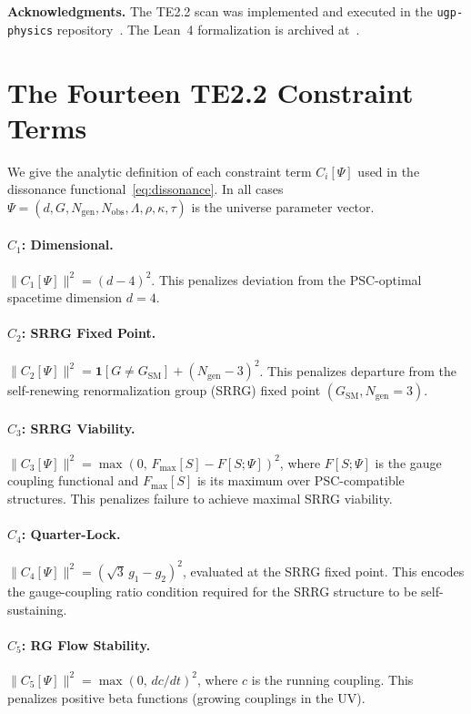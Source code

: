 \documentclass[11pt,twocolumn]{article}
\theoremstyle{remark}
\begin{document}
\bigskip
\noindent\textbf{Acknowledgments.}
The TE2.2 scan was implemented and executed in the
\texttt{ugp-physics} repository~\cite{ugp-physics-repo}.
The Lean~4 formalization is archived at~\cite{SpivackUGPFormalization}.

\appendix
\section{The Fourteen TE2.2 Constraint Terms}
\label{app:constraints}

We give the analytic definition of each constraint term $C_i[\Psi]$
used in the dissonance functional~\eqref{eq:dissonance}.
In all cases $\Psi=(d,G,N_{\mathrm{gen}},N_{\mathrm{obs}},\Lambda,
\rho,\kappa,\tau)$ is the universe parameter vector.

\paragraph{$C_1$: Dimensional.}
$\|C_1[\Psi]\|^2 = (d-4)^2$.
This penalizes deviation from the PSC-optimal spacetime dimension
$d=4$.

\paragraph{$C_2$: SRRG Fixed Point.}
$\|C_2[\Psi]\|^2 = \mathbf{1}[G\neq G_{\mathrm{SM}}] +
(N_{\mathrm{gen}}-3)^2$.
This penalizes departure from the self-renewing renormalization
group (SRRG) fixed point $(G_{\mathrm{SM}}, N_{\mathrm{gen}}=3)$.

\paragraph{$C_3$: SRRG Viability.}
$\|C_3[\Psi]\|^2 = \max(0,\, F_{\mathrm{max}}[S] - F[S;\Psi])^2$,
where $F[S;\Psi]$ is the gauge coupling functional and
$F_{\mathrm{max}}[S]$ is its maximum over PSC-compatible structures.
This penalizes failure to achieve maximal SRRG viability.

\paragraph{$C_4$: Quarter-Lock.}
$\|C_4[\Psi]\|^2 = (\sqrt{3}\,g_1 - g_2)^2$,
evaluated at the SRRG fixed point.
This encodes the gauge-coupling ratio condition required for the
SRRG structure to be self-sustaining.

\paragraph{$C_5$: RG Flow Stability.}
$\|C_5[\Psi]\|^2 = \max(0,\, dc/dt)^2$,
where $c$ is the running coupling.
This penalizes positive beta functions (growing couplings in the UV).
\end{document}
